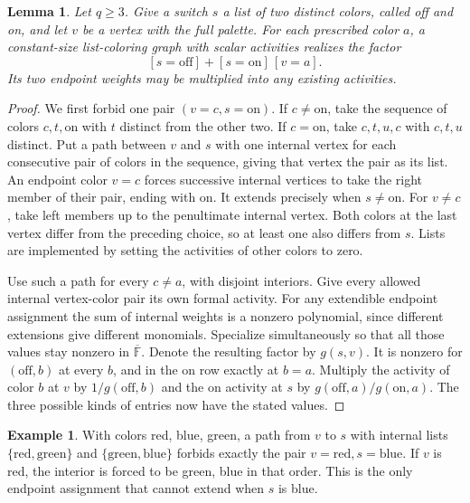 \documentclass[11pt]{article}
\newtheorem{lemma}[theorem]{Lemma}
\theoremstyle{definition}
\newtheorem{example}[theorem]{Example}
\newcommand{\F}{\mathbb F}
\newcommand{\olF}{\overline{\F}}
\begin{document}
\begin{lemma}\label{lem:implication}
Let \(q\ge3\). Give a switch \(s\) a list of two distinct colors, called off and on, and let \(v\) be a vertex with the full palette. For each prescribed color \(a\), a constant-size list-coloring graph with scalar activities realizes the factor
\[
 [s=\mathrm{off}]+[s=\mathrm{on}]\,[v=a].
\]
Its two endpoint weights may be multiplied into any existing activities.
\end{lemma}
\begin{proof}
We first forbid one pair \((v=c,s=\mathrm{on})\). If \(c\ne\mathrm{on}\), take the sequence of colors \(c,t,\mathrm{on}\) with \(t\) distinct from the other two. If \(c=\mathrm{on}\), take \(c,t,u,c\) with \(c,t,u\) distinct. Put a path between \(v\) and \(s\) with one internal vertex for each consecutive pair of colors in the sequence, giving that vertex the pair as its list. An endpoint color \(v=c\) forces successive internal vertices to take the right member of their pair, ending with \(\mathrm{on}\). It extends precisely when \(s\ne\mathrm{on}\). For \(v\ne c\), take left members up to the penultimate internal vertex. Both colors at the last vertex differ from the preceding choice, so at least one also differs from \(s\). Lists are implemented by setting the activities of other colors to zero.

Use such a path for every \(c\ne a\), with disjoint interiors. Give every allowed internal vertex-color pair its own formal activity. For any extendible endpoint assignment the sum of internal weights is a nonzero polynomial, since different extensions give different monomials. Specialize simultaneously so that all those values stay nonzero in \(\olF\). Denote the resulting factor by \(g(s,v)\). It is nonzero for \((\mathrm{off},b)\) at every \(b\), and in the on row exactly at \(b=a\). Multiply the activity of color \(b\) at \(v\) by \(1/g(\mathrm{off},b)\) and the on activity at \(s\) by \(g(\mathrm{off},a)/g(\mathrm{on},a)\). The three possible kinds of entries now have the stated values.
\end{proof}

\begin{example}
With colors red, blue, green, a path from \(v\) to \(s\) with internal lists \(\{\text{red},\text{green}\}\) and \(\{\text{green},\text{blue}\}\) forbids exactly the pair \(v=\text{red},s=\text{blue}\). If \(v\) is red, the interior is forced to be green, blue in that order. This is the only endpoint assignment that cannot extend when \(s\) is blue.
\end{example}
\end{document}
